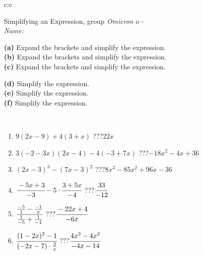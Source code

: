 \documentclass[10pt]{report}
\newcommand\omicron{o}
\begin{document}
\newpage
\thispagestyle{empty}
\begin{tabular}{c:c}
\begin{minipage}[c][104.5mm][t]{0.5\linewidth}
\begin{center}
\vspace{7mm}
{\huge Simplifying an Expression, group \textit{Omicron $\omicron$} -}\\[5mm]
\textit{Name:}\phantom{xxxxxxxxxxxxxxxxxxxxxxxxxxxxxxxxxxxxxxxxxxxxxxxxxxxxxxxxxxxxxxxxx}\\[5mm]
\begin{minipage}{0.95\linewidth}
\begin{center}
{\small \begin{minipage}{0.6\textwidth}
\textbf{(a)} Expand the brackets and simplify the expression. \\[1mm]
\textbf{(b)} Expand the brackets and simplify the expression. \\[1mm]
\textbf{(c)} Expand the brackets and simplify the expression.
\end{minipage} \begin{minipage}{0.39\textwidth}
\textbf{(d)} Simplify the expression. \\[1mm]
\textbf{(e)} Simplify the expression. \\[1mm]
\textbf{(f)} Simplify the expression.
\end{minipage}
}
\end{center}
\end{minipage}
\\[4mm]
\begin{minipage}{0.79\linewidth}
\begin{center}
\begin{varwidth}{\linewidth}
\begin{enumerate}
\normalsize
\item $9(2x-9)+4(3+x)$\quad \dotfill\; ???\;\dotfill \quad $22x$
\item $3(-2-3x)(2x-4)-4(-3+7x)$\quad \dotfill\; ???\;\dotfill \quad $-18x^2-4x+36$
\item $(2x-3)^3-(7x-3)^2$\quad \dotfill\; ???\;\dotfill \quad $8x^3-85x^2+96x-36$
\item $\cfrac{-5x+3}{-3}-5\cdot\cfrac{3+5x}{-4}$\quad \dotfill\; ???\;\dotfill \quad $\cfrac{33}{-12}$
\item $\cfrac{\frac{-5}{1}-\frac{-1}{x}}{\frac{1}{-5}+\frac{1}{-1}}$\quad \dotfill\; ???\;\dotfill \quad $\cfrac{-22x+4}{-6x}$
\item $\cfrac{(1-2x)^2-1}{(-2x-7)\cdot\frac{2}{x}}$\quad \dotfill\; ???\;\dotfill \quad $\cfrac{4x^3-4x^2}{-4x-14}$

\end{enumerate}
\end{varwidth}
\end{center}
\end{minipage}
\end{center}
\end{minipage}
\end{tabular}
\end{document}
